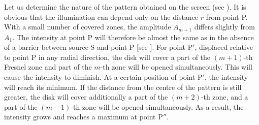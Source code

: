 Let us determine the nature of the pattern obtained on the screen (see ).
It is obvious that the illumination can depend only on the distance $r$ from point P.
With a small number of covered zones, the amplitude $A_{m+1}$ differs slightly from $A_1$.
The intensity at point P will therefore be almost the same as in the absence of a barrier between source S and point P [see ].
For point P$'$, displaced relative to point P in any radial direction, the disk will cover a part of the $(m+1)$-th Fresnel zone and part of the
$m$-th zone will be opened simultaneously.
This will cause the intensity to diminish.
At a certain position of point P$'$, the intensity will reach its minimum.
If the distance from the centre of the pattern is still greater, the disk will cover additionally a part of the $(m+2)$-th zone, and a part of the $(m-1)$-th zone will be opened simultaneously.
As a result, the intensity grows and reaches a
maximum at point P$''$.

